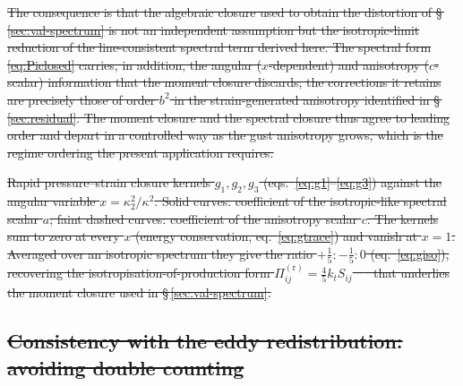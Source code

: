 \documentclass[lineno]{JFM-FLM_Au}
\newcounter{assumption}
\providecommand{\DIFdel}[1]{{\protect\color{red}\sout{#1}}}                      %
\providecommand{\DIFdelFL}[1]{\DIFdel{#1}} %
\begin{document}
\DIFdel{The consequence is that the algebraic closure used to obtain the distortion of
\S\,\ref{sec:val-spectrum} is not an independent assumption but the
isotropic-limit reduction of the line-consistent spectral term derived here.
The spectral form \eqref{eq:Piclosed} carries, in addition, the angular
($x$-dependent) and anisotropy ($c$-scalar) information that the moment closure
discards; the corrections it retains are precisely those of order $b^2$ in the
strain-generated anisotropy identified in \S\,\ref{sec:residual}. The moment
closure and the spectral closure thus agree to leading order and depart in a
controlled way as the gust anisotropy grows, which is the regime ordering the
present application requires.
}%

{%
\DIFdelFL{Rapid pressure--strain closure kernels $g_1,g_2,g_3$
  (eqs.~\eqref{eq:g1}--\eqref{eq:g3}) against the angular variable
  $x=\kappa_2^2/\kappa^2$. Solid curves: coefficient of the isotropic-like
  spectral scalar $a$; faint dashed curves: coefficient of the anisotropy
  scalar $c$. The kernels sum to zero at every $x$ (energy conservation,
  eq.~\eqref{eq:gtrace}) and vanish at $x=1$. Averaged over an isotropic
  spectrum they give the ratio $+\tfrac15:-\tfrac15:0$
  (eq.~\eqref{eq:giso}), recovering the isotropisation-of-production form
  $\Pi^{(\mathrm r)}_{ij}=\tfrac45 k_t S_{ij}$ \mbox{%
\citep{Crow1968} }\hskip0pt%
that underlies
  the moment closure used in \S\,\ref{sec:val-spectrum}.}}

\subsection{\DIFdel{Consistency with the eddy redistribution: avoiding double
counting}}%
\addtocounter{subsection}{-1}%
\end{document}
